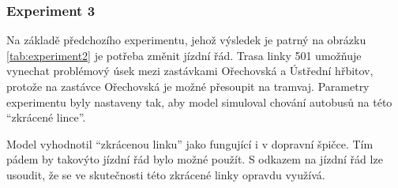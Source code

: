 \documentclass[a4paper]{article}
\begin{document}
            \subsubsection{Experiment 3}
            \label{subsubsec:experiment3}

				Na základě předchozího experimentu, jehož výsledek je patrný na obrázku \ref{tab:experiment2} je potřeba změnit jízdní řád. Trasa linky 501 umožňuje vynechat problémový úsek mezi zastávkami Ořechovská a Ústřední hřbitov, protože na zastávce Ořechovská je možné přesoupit na tramvaj. Parametry experimentu byly nastaveny tak, aby model simuloval chování autobusů na této \enquote{zkrácené lince}.
                

                \begin{table}[H]
                    \centering
                    \caption{Parametry experimentu 3}
                    \label{tab:experiment3}
                \end{table}

            

                Model vyhodnotil \enquote{zkrácenou linku} jako fungující i v dopravní špičce. Tím pádem by takovýto jízdní řád bylo možné použít. S odkazem na jízdní řád \cite{Jizdni_rad} lze usoudit, že se ve skutečnosti této zkrácené linky opravdu využívá. 
\end{document}
